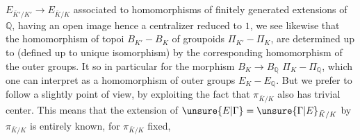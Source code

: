 $E_{\bar K'/K'}\longrightarrow E_{\bar K/K}$ associated to homomorphisms  of finitely generated extensions of $\mathbb Q$, having an open image hence a centralizer reduced to $1$, we see likewise that the homomorphism of topoi $B_{K'}-B_K$  of groupoids $\Pi_{K'}-\Pi_K$, are determined up to  (defined up to unique isomorphism) by the corresponding homomorphism of the outer groups. It  so in particular for the  morphism $B_K\longrightarrow B_{\mathbb Q}$  $\Pi_K-\Pi_{\mathbb Q}$, which one can interpret  as a homomorphism of  outer groups $E_K-E_{\mathbb Q}$. But we prefer to follow a slightly  point of view, by exploiting the fact that $\pi_{\bar K/K}$ also has trivial center. This means that the extension of $\unsure{E|\Gamma}=\unsure{\Gamma|E}_{\bar K/K}$ by $\pi_{\bar K/K}$ is entirely known,  for $\pi_{\bar K/K}$  fixed,

